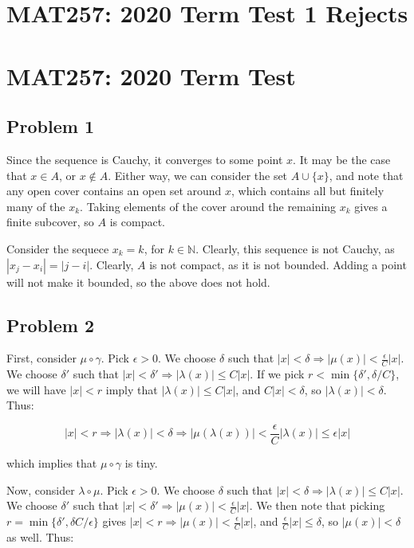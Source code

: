 \documentclass[10pt, oneside]{amsart}
\begin{document}
      \section{MAT257: 2020 Term Test 1 Rejects}

      \section{MAT257: 2020 Term Test}

      \subsection{Problem 1}

      Since the sequence is Cauchy, it converges to some point $x$. It may be the case that $x \in A$, or $x \notin A$. Either way, we can consider the set $A \cup \{x\}$, and note that any open cover contains an open set
      around $x$, which contains all but finitely many of the $x_k$. Taking elements of the cover around the remaining $x_k$ gives a finite subcover, so $A$ is compact.
      \newline

      Consider the sequece $x_k = k$, for $k \in \mathbb{N}$. Clearly, this sequence is not Cauchy, as $|x_j - x_i| = |j - i|$. Clearly, $A$ is not compact, as it is not bounded. Adding a point will not make it bounded,
      so the above does not hold.

      \subsection{Problem 2}

      First, consider $\mu \circ \gamma$. Pick $\epsilon > 0$. We choose $\delta$ such that $|x| < \delta \Rightarrow |\mu(x)| < \frac{\epsilon}{C} |x|$. We choose $\delta'$ such that $|x| < \delta' \Rightarrow |\lambda(x)| \leq C|x|$.
      If we pick $r < \min \{\delta', \delta/C\}$, we will have $|x| < r$ imply that $|\lambda(x)| \leq C|x|$, and $C|x| < \delta$, so $|\lambda(x)| < \delta$. Thus:

      $$|x| < r \Rightarrow |\lambda(x)| < \delta \Rightarrow |\mu(\lambda(x))| < \frac{\epsilon}{C} |\lambda(x)| \leq \epsilon |x|$$

      which implies that $\mu \circ \gamma$ is tiny.
      \newline

      Now, consider $\lambda \circ \mu$. Pick $\epsilon > 0$. We choose $\delta$ such that $|x| < \delta \Rightarrow |\lambda(x)| \leq C|x|$. We choose $\delta'$ such that $|x| < \delta' \Rightarrow |\mu(x)| < \frac{\epsilon}{C} |x|$.
      We then note that picking $r = \min \{\delta', \delta C/\epsilon\}$ gives $|x| < r \Rightarrow |\mu(x)| < \frac{\epsilon}{C} |x|$, and $\frac{\epsilon}{C} |x| \leq \delta$, so $|\mu(x)| < \delta$ as well. Thus:
\end{document}
